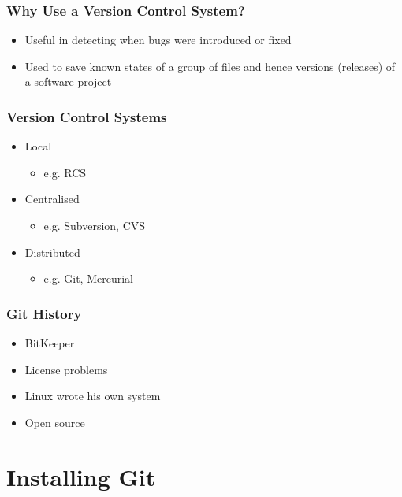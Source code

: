 \documentclass{git_course}
\begin{document}
\begin{frame}
\frametitle{Why Use a Version Control System?}
\begin{itemize}
    \item Useful in detecting when bugs were introduced or fixed
    \item Used to save known states of a group of files and hence versions
        (releases) of a software project
\end{itemize}
\end{frame}

\begin{frame}
\frametitle{Version Control Systems}
\begin{itemize}
    \item Local
    \begin{itemize}
        \item e.g. RCS
    \end{itemize}
    \item Centralised
    \begin{center}
        \resizebox{!}{0.7\textheight}{
            
        }
    \end{center}
    \begin{itemize}
        \item e.g. Subversion, CVS
    \end{itemize}
    \item Distributed
    \begin{itemize}
        \item e.g. Git, Mercurial
    \end{itemize}
\end{itemize}
\end{frame}

\begin{frame}
\frametitle{Git History}
\begin{itemize}
    \item BitKeeper
    \item License problems
    \item Linux wrote his own system
    \item Open source
\end{itemize}
\end{frame}


\section{Installing Git}
\end{document}
